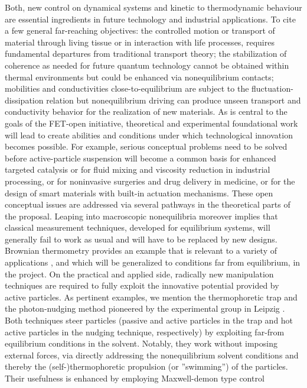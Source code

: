 Both, new control on dynamical systems and kinetic to thermodynamic behaviour are essential
ingredients in future technology and industrial applications.  To cite a few general
far-reaching objectives: the controlled motion or transport of material through living
tissue or in interaction with life processes, requires fundamental departures from
traditional transport theory; the stabilization of coherence as needed for future quantum
technology cannot be obtained within thermal environments but could be enhanced via
nonequilibrium contacts; mobilities and conductivities close-to-equilibrium are subject to
the fluctuation-dissipation relation but nonequilibrium driving can produce unseen transport
and conductivity behavior for the realization of new materials.  As is central to the goals
of the FET-open initiative, theoretical and experimental foundational work will lead to
create abilities and conditions under which technological innovation becomes possible.  For
example, serious conceptual problems need to be solved before active-particle suspension
will become a common basis for enhanced targeted catalysis or for fluid mixing and viscosity
reduction in industrial processing, or for noninvasive surgeries and drug delivery in
medicine, or for the design of smart materials with built-in actuation mechanisms. These
open conceptual issues are addressed via several pathways in the theoretical parts of the
proposal.  Leaping into macroscopic nonequilibria moreover implies that classical
measurement techniques, developed for equilibrium systems, will generally fail to work as
usual and will have to be replaced by new designs. Brownian thermometry provides an example
that is relevant to a variety of applications \cite{kroy:2014}, and which will be
generalized to conditions far from equilibrium, in the project.  On the practical and
applied side, radically new manipulation techniques are required to fully exploit the
innovative potential provided by active particles. As pertinent examples, we mention the
thermophoretic trap and the photon-nudging method pioneered by the experimental group in
Leipzig \cite{Qian2013,Braun:NanoLetters:2015}.  Both techniques steer particles (passive
and active particles in the trap and hot active particles in the nudging technique,
respectively) by exploiting far-from equilibrium conditions in the solvent. Notably, they
work without imposing external forces, via directly addressing the nonequilibrium solvent
conditions and thereby the (self-)thermophoretic propulsion (or ''swimming'') of the
particles. Their usefulness is enhanced by employing Maxwell-demon type control
